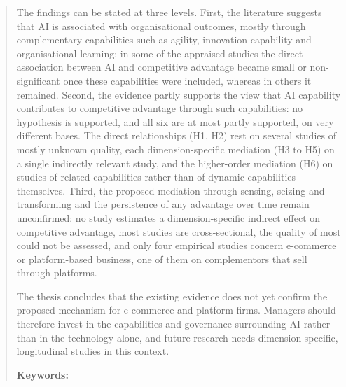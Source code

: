 \documentclass[12pt]{Thesis} %
\begin{document}
\begin{abstract}
The findings can be stated at three levels. First, the literature suggests that AI is associated with organisational outcomes, mostly through complementary capabilities such as agility, innovation capability and organisational learning; in some of the appraised studies the direct association between AI and competitive advantage became small or non-significant once these capabilities were included, whereas in others it remained. Second, the evidence partly supports the view that AI capability contributes to competitive advantage through such capabilities: no hypothesis is supported, and all six are at most partly supported, on very different bases. The direct relationships (H1, H2) rest on several studies of mostly unknown quality, each dimension-specific mediation (H3 to H5) on a single indirectly relevant study, and the higher-order mediation (H6) on studies of related capabilities rather than of dynamic capabilities themselves. Third, the proposed mediation through sensing, seizing and transforming and the persistence of any advantage over time remain unconfirmed: no study estimates a dimension-specific indirect effect on competitive advantage, most studies are cross-sectional, the quality of most could not be assessed, and only four empirical studies concern e-commerce or platform-based business, one of them on complementors that sell through platforms.

The thesis concludes that the existing evidence does not yet confirm the proposed mechanism for e-commerce and platform firms. Managers should therefore invest in the capabilities and governance surrounding AI rather than in the technology alone, and future research needs dimension-specific, longitudinal studies in this context.

\bigskip
\textbf{Keywords:} \keywordnames
\end{abstract}



\tableofcontents

\end{document}
